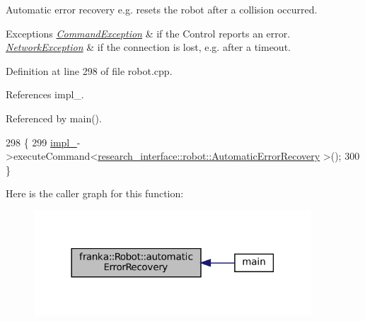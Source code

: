 Automatic error recovery e.\+g. resets the robot after a collision occurred.


\begin{DoxyExceptions}{Exceptions}
{\em \hyperlink{structfranka_1_1CommandException}{Command\+Exception}} & if the Control reports an error. \\
\hline
{\em \hyperlink{structfranka_1_1NetworkException}{Network\+Exception}} & if the connection is lost, e.\+g. after a timeout. \\
\hline
\end{DoxyExceptions}


Definition at line 298 of file robot.\+cpp.



References impl\+\_\+.



Referenced by main().


\begin{DoxyCode}
298                                    \{
299   \hyperlink{classfranka_1_1Robot_aca155054184e5b6478942fd6a1b82ba4}{impl\_}->executeCommand<\hyperlink{structresearch__interface_1_1robot_1_1AutomaticErrorRecovery}{research\_interface::robot::AutomaticErrorRecovery}
      >();
300 \}
\end{DoxyCode}
Here is the caller graph for this function\+:
\nopagebreak
\begin{figure}[H]
\begin{center}
\leavevmode
\includegraphics[width=294pt]{classfranka_1_1Robot_af682aa673415718715bd859116bc2fed_icgraph}
\end{center}
\end{figure}
\mbox{\label{classfranka_1_1Robot_a5b5ba0a4f2bfd20be963b05622e629e1}} 
